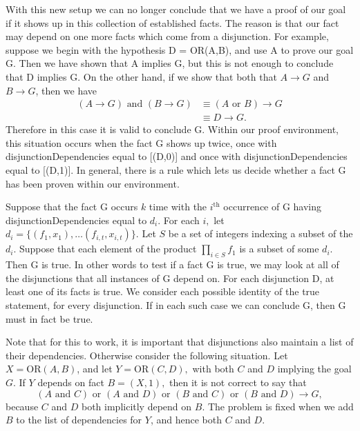 \documentclass[11pt, oneside]{article}   	%
\begin{document}
With this new setup we can no longer conclude that we have a proof of our goal if it shows up in this collection of established facts.  The reason is that our fact may depend on one more facts which come from a disjunction.  For example, suppose we begin with the hypothesis D = OR(A,B), and use A to prove our goal G.  Then we have shown that A implies G, but this is not enough to conclude that D implies G.  On the other hand, if we show that both that $A\longrightarrow G$ and $B\longrightarrow G$, then we have
\begin{align*}
(A\longrightarrow G) \text{ and } (B \longrightarrow G) &\equiv (A \text{ or } B) \longrightarrow G \\
&\equiv D \longrightarrow G.
\end{align*} Therefore in this case it is valid to conclude G. Within our proof environment, this situation occurs when the fact G shows up twice, once with disjunctionDependencies equal to [(D,0)] and once with disjunctionDependencies equal to [(D,1)].  In general, there is a rule which lets us decide whether a fact G has been proven within our environment.

Suppose that the fact G occurs $k$ time with the $i^{\text{th}}$ occurrence of G having disjunctionDependencies equal to $d_i.$  For each $i,$ let $d_i = \{(f_1,x_1), \ldots (f_{i,t}, x_{i,t})\}.$ Let $S$ be a set of integers indexing a subset of the $d_i$. Suppose that each element of the product $\prod_{i\in S} f_1$ is a subset of some $d_i$.  Then G is true.  In other words to test if a fact G is true, we may look at all of the disjunctions that all instances of G depend on.  For each disjunction D, at least one of its facts is true.  We consider each possible identity of the true statement, for every disjunction.  If in each such case we can conclude G, then G must in fact be true.

Note that for this to work, it is important that disjunctions also maintain a list of their dependencies.  Otherwise consider the following situation.  Let $X = \text{OR}(A,B)$, and let $Y = \text{OR}(C,D),$ with both $C$ and $D$ implying the goal $G$.  If $Y$ depends on fact $B = (X,1),$ then it is not correct to say that $$(A \text{ and } C)\text{ or }(A \text{ and } D)\text{ or }(B \text{ and } C)\text{ or }(B \text{ and } D) \longrightarrow G,$$ because $C$ and $D$ both implicitly depend on $B$.  The problem is fixed when we add $B$ to the list of dependencies for $Y$, and hence both $C$ and $D$.
\end{document}
